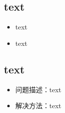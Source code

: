 \subsection{text}
\begin{itemize}
    \item text
    \item text
\end{itemize}



\subsection{text}
\begin{itemize}
    \item 问题描述：text
    \item 解决方法：text
\end{itemize}







